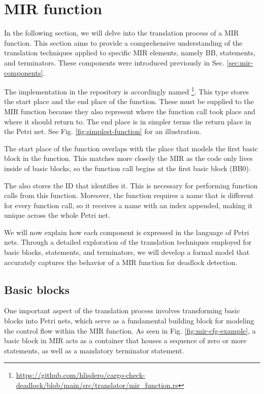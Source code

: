 \section{MIR function}

In the following section,
we will delve into the translation process of a \acrshort{MIR} function.
This section aims to provide a comprehensive understanding
of the translation techniques applied to specific \acrshort{MIR} elements,
namely \acrfull{BB}, statements, and terminators.
These components were introduced previously in Sec. \ref{sec:mir-components}.

The implementation in the repository is accordingly named
\footnote{\url{https://github.com/hlisdero/cargo-check-deadlock/blob/main/src/translator/mir_function.rs}}.
This type stores the start place and the end place of the function.
These must be supplied to the \acrshort{MIR} function because
they also represent where the function call took place and where it should return to.
The end place is in simpler terms the return place in the Petri net.
See Fig. \ref{fig:simplest-function} for an illustration.

The start place of the function overlaps with the place
that models the first basic block in the function.
This matches more closely the \acrshort{MIR} as the code only lives inside of basic blocks,
so the function call begins at the first basic block (BB0).

The  also stores the ID that identifies it.
This is necessary for performing function calls from this function.
Moreover, the function requires a name that is different for every function call,
so it receives a name with an index appended, making it unique across the whole Petri net.

We will now explain how each component is expressed in the language of Petri nets.
Through a detailed exploration of the translation techniques employed for
basic blocks, statements, and terminators, we will develop a formal model that
accurately captures the behavior of a \acrshort{MIR} function for deadlock detection.

\subsection{Basic blocks}

One important aspect of the translation process involves transforming basic blocks into Petri nets,
which serve as a fundamental building block for modeling the control flow within the \acrshort{MIR} function.
As seen in Fig. \ref{fig:mir-cfg-example}, a basic block in \acrshort{MIR} acts as a container
that houses a sequence of zero or more statements, as well as a mandatory terminator statement.

